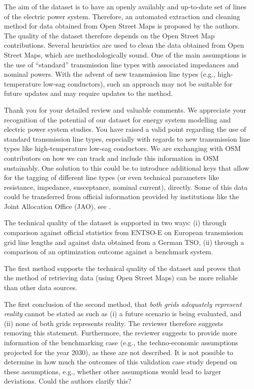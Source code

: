 \documentclass{response}
\begin{document}
\RC The aim of the dataset is to have an openly availably and up-to-date set of lines of the electric power system. Therefore, an automated extraction and cleaning method for data obtained from Open Street Maps is proposed by the authors. The quality of the dataset therefore depends on the Open Street Map contributions. Several heuristics are used to clean the data obtained from Open Street Maps, which are methodologically sound. One of the main assumptions is the use of “standard” transmission line types with associated impedances and nominal powers. With the advent of new transmission line types (e.g., high-temperature low-sag conductors), such an approach may not be suitable for future updates and may require updates to the method.

\AR Thank you for your detailed review and valuable comments. We appreciate your recognition of the potential of our dataset for energy system modelling and electric power system studies. You have raised a valid point regarding the use of standard transmission line types, especially with regards to new transmission line types like high-temperature low-sag conductors. We are exchanging with OSM contributors on how we can track and include this information in OSM sustainably. One solution to this could be to introduce additional keys that allow for the tagging of different line types (or even technical parameters like resistance, impedance, susceptance, nominal current), directly. Some of this data could be transferred from official information provided by institutions like the Joint Allocation Office (JAO), see \cite{jaoStaticGridModel2023}.

\RC The technical quality of the dataset is supported in two ways: (i) through comparison against official statistics from ENTSO-E on European transmission grid line lengths and against data obtained from a German TSO, (ii) through a comparison of an optimization outcome against a benchmark system. 

\RC The first method supports the technical quality of the dataset and proves that the method of retrieving data (using Open Street Maps) can be more reliable than other data sources. 

\RC The first conclusion of the second method, that \textit{both grids adequately represent reality} cannot be stated as such as (i) a future scenario is being evaluated, and (ii) none of both grids represents reality. The reviewer therefore suggests removing this statement. Furthermore, the reviewer suggests to provide more information of the benchmarking case (e.g., the techno-economic assumptions projected for the year 2030), as these are not described. It is not possible to determine in how much the outcomes of this validation case study depend on these assumptions, e.g., whether other assumptions would lead to larger deviations. Could the authors clarify this? 
\end{document}
